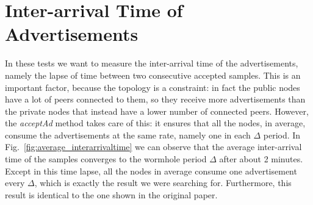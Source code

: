 \newpage
\section{Inter-arrival Time of Advertisements}
\label{sec:interarrivaltime}
In these tests we want to measure the inter-arrival time of the advertisements, namely the lapse of time between two consecutive accepted samples. This is an important factor, because the topology is a constraint: in fact the public nodes have a lot of peers connected to them, so they receive more advertisements than the private nodes that instead have a lower number of connected peers. However, the \textit{acceptAd} method takes care of this: it ensures that all the nodes, in average, consume the advertisements at the same rate, namely one in each $\Delta$ period. In Fig.~\ref{fig:average_interarrivaltime} we can observe that the average inter-arrival time of the samples converges to the wormhole period $\Delta$ after about 2 minutes. Except in this time lapse, all the nodes in average consume one advertisement every $\Delta$, which is exactly the result we were searching for. Furthermore, this result is identical to the one shown in the original paper.

